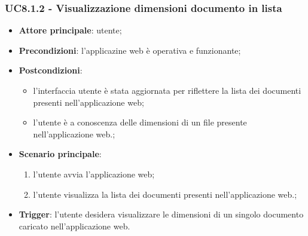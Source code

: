 \documentclass[10pt, a4paper]{article}
\begin{document}
    \subsubsection{UC8.1.2 - Visualizzazione dimensioni documento in lista}
    \begin{itemize}
        \item \textbf{Attore principale}: utente;
        \item \textbf{Precondizioni}: l'applicazine web è operativa e funzionante;
        \item \textbf{Postcondizioni}:
        \begin{itemize}
            \item l'interfaccia utente è stata aggiornata per riflettere la lista dei documenti presenti nell'applicazione web;
            \item l'utente è a conoscenza delle dimensioni di un file presente nell'applicazione web.;
        \end{itemize}
        \item \textbf{Scenario principale}:
        \begin{enumerate}
            \item l'utente avvia l'applicazione web;
            \item l'utente visualizza la lista dei documenti presenti nell'applicazione web.;
        \end{enumerate}
        \item \textbf{Trigger}: l'utente desidera visualizzare le dimensioni di un singolo documento caricato nell'applicazione web.
    \end{itemize}
\end{document}
